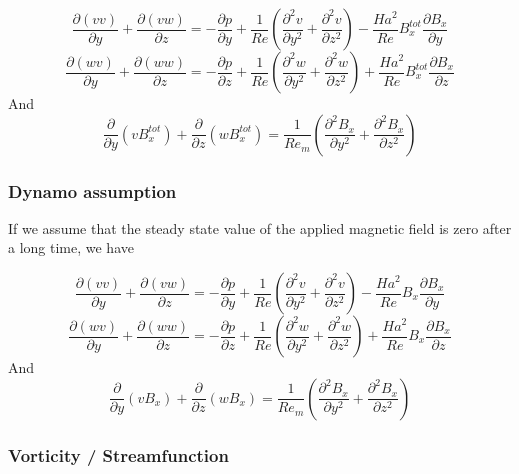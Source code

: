 \documentclass[11pt]{article}
\begin{document}
\begin{equation}
	\frac{\partial (v v)}{\partial y}
	+ \frac{\partial (v w)}{\partial z}
	= 
	- \frac{\partial p}{\partial y}
	+ \frac{1}{Re}
	\left(
	\frac{\partial^2 v}{\partial y^2}
	+\frac{\partial^2 v}{\partial z^2}
	\right)
	- 
	\frac{Ha^2}{Re}
	B_x^{tot}
	\frac{\partial B_x}{\partial y} 
\end{equation}
\begin{equation}
	\frac{\partial (w v)}{\partial y}
	+ \frac{\partial (w w)}{\partial z}
	= 
	- \frac{\partial p}{\partial z}
	+ \frac{1}{Re}
	\left(
	\frac{\partial^2 w}{\partial y^2}
	+\frac{\partial^2 w}{\partial z^2}
	\right)
	+ \frac{Ha^2}{Re}
	B_x^{tot}
	\frac{\partial B_x}{\partial z} 
\end{equation}
And
\begin{equation}
	\frac{\partial}{\partial y} (v B_x^{tot})
	+ \frac{\partial}{\partial z} (w B_x^{tot})
	=
	\frac{1}{Re_m}
	\left(
	\frac{\partial^2 B_x}{\partial y^2}
	+
	\frac{\partial^2 B_x}{\partial z^2}
	\right)
\end{equation}

\subsubsection{Dynamo assumption}
If we assume that the steady state value of the applied magnetic field is zero after a long time, we have

\begin{equation}
	\frac{\partial (v v)}{\partial y}
	+ \frac{\partial (v w)}{\partial z}
	= 
	- \frac{\partial p}{\partial y}
	+ \frac{1}{Re}
	\left(
	\frac{\partial^2 v}{\partial y^2}
	+\frac{\partial^2 v}{\partial z^2}
	\right)
	- 
	\frac{Ha^2}{Re}
	B_x
	\frac{\partial B_x}{\partial y} 
\end{equation}
\begin{equation}
	\frac{\partial (w v)}{\partial y}
	+ \frac{\partial (w w)}{\partial z}
	= 
	- \frac{\partial p}{\partial z}
	+ \frac{1}{Re}
	\left(
	\frac{\partial^2 w}{\partial y^2}
	+\frac{\partial^2 w}{\partial z^2}
	\right)
	+ \frac{Ha^2}{Re}
	B_x
	\frac{\partial B_x}{\partial z} 
\end{equation}
And
\begin{equation}
	\frac{\partial}{\partial y} (v B_x)
	+ \frac{\partial}{\partial z} (w B_x)
	=
	\frac{1}{Re_m}
	\left(
	\frac{\partial^2 B_x}{\partial y^2}
	+
	\frac{\partial^2 B_x}{\partial z^2}
	\right)
\end{equation}

\subsubsection{Vorticity / Streamfunction}
\end{document}
